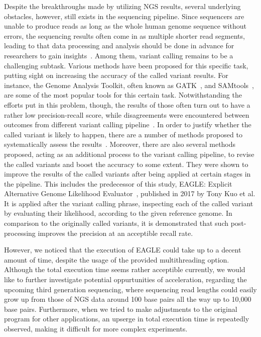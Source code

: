 \documentclass{PHlab-thesis}
\begin{document}
Despite the breakthroughs made by utilizing NGS results, several underlying obstacles, however, still exists in the sequencing pipeline. Since sequencers are unable to produce reads as long as the whole human genome sequence without errors, the sequencing results often come in as multiple shorter read segments, leading to that data processing and analysis should be done in advance for researchers to gain insights~\cite{muzzey2015understanding}. Among them, variant calling remains to be a challenging subtask. Various methods have been proposed for this specific task, putting sight on increasing the accuracy of the called variant results. For instance, the Genome Analysis Toolkit, often known as GATK~\cite{mckenna2010genome}, and SAMtools~\cite{li2009sequence}, are some of the most popular tools for this certain task. Notwithstanding the efforts put in this problem, though, the results of those often turn out to have a rather low  precision-recall score, while disagreements were encountered between outcomes from different variant calling pipeline~\cite{o2013low}. In order to justify whether the called variant is likely to happen, there are a number of methods proposed to systematically assess the results~\cite{hwang2015systematic,yu2013comparing}. Moreover, there are also several methods proposed, acting as an additional process to the variant calling pipeline, to revise the called variants and boost the accuracy to some extent. They were shown to improve the results of the called variants after being applied at certain stages in the pipeline. This includes the predecessor of this study, EAGLE: Explicit Alternative Genome Likelihood Evaluator~\cite{kuo2018eagle}, published in 2017 by Tony Kuo et al. It is applied after the variant calling phrase, inspecting each of the called variant by evaluating their likelihood, according to the given reference genome. In comparison to the originally called variants, it is demonstrated that such post-processing improves the precision at an acceptible recall rate.

However, we noticed that the execution of EAGLE could take up to a decent amount of time, despite the usage of the provided multithreading option. Although the total execution time seems rather acceptible currently, we would like to further investigate potential oppurtunities of acceleration, regarding the upcoming third generation sequencing, where sequencing read lengths could easily grow up from those of NGS data around 100 base pairs all the way up to 10,000 base pairs. Furthermore, when we tried to make adjustments to the original program for other applications, an upserge in total execution time is repeatedly observed, making it difficult for more complex experiments.
\end{document}
